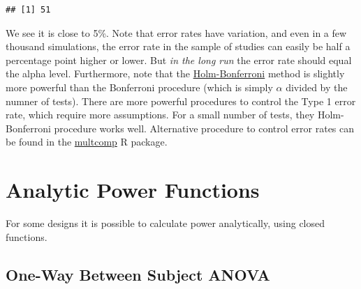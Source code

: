 \documentclass[]{book}
\begin{document}
\begin{verbatim}
## [1] 51
\end{verbatim}

We see it is close to 5\%. Note that error rates have variation, and even in a few thousand simulations, the error rate in the sample of studies can easily be half a percentage point higher or lower. But \emph{in the long run} the error rate should equal the alpha level. Furthermore, note that the \href{https://en.wikipedia.org/wiki/Holm\%E2\%80\%93Bonferroni_method}{Holm-Bonferroni} method is slightly more powerful than the Bonferroni procedure (which is simply \(\alpha\) divided by the numner of tests). There are more powerful procedures to control the Type 1 error rate, which require more assumptions. For a small number of tests, they Holm-Bonferroni procedure works well. Alternative procedure to control error rates can be found in the \href{https://cran.r-project.org/web/packages/multcomp/index.html}{multcomp} R package.

\hypertarget{analytic-power-functions}{%
\chapter{Analytic Power Functions}\label{analytic-power-functions}}

For some designs it is possible to calculate power analytically, using closed functions.

\hypertarget{one-way-between-subject-anova}{%
\section{One-Way Between Subject ANOVA}\label{one-way-between-subject-anova}}
\end{document}
